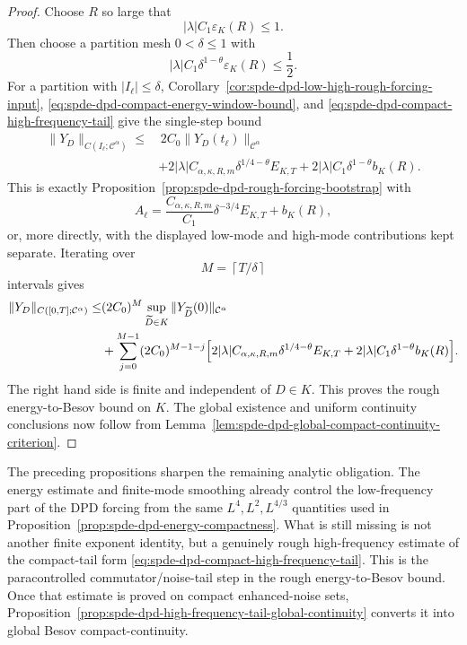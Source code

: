 \begin{proof}
Choose \(R\) so large that
\[
  |\lambda|C_1\varepsilon_K(R)\leq1 .
\]
Then choose a partition mesh \(0<\delta\leq1\) with
\begin{equation}
  |\lambda|C_1\delta^{1-\theta}\varepsilon_K(R)\leq\frac12 .
  \label{eq:spde-dpd-tail-global-absorption-choice}
\end{equation}
For a partition with \(|I_\ell|\leq\delta\),
Corollary~\ref{cor:spde-dpd-low-high-rough-forcing-input},
\eqref{eq:spde-dpd-compact-energy-window-bound}, and
\eqref{eq:spde-dpd-compact-high-frequency-tail} give the single-step bound
\[
\begin{aligned}
  \|Y_D\|_{C(I_\ell;\mathcal C^\alpha)}
  \leq
  &\,2C_0\|Y_D(t_\ell)\|_{\mathcal C^\alpha}
\\
  &+2|\lambda|C_{\alpha,\kappa,R,m}\delta^{1/4-\theta}E_{K,T}
   +2|\lambda|C_1\delta^{1-\theta}b_K(R).
\end{aligned}
\]
This is exactly Proposition~\ref{prop:spde-dpd-rough-forcing-bootstrap}
with
\[
  A_\ell
  =
  \frac{C_{\alpha,\kappa,R,m}}{C_1}
  \delta^{-3/4}E_{K,T}+b_K(R),
\]
or, more directly, with the displayed low-mode and high-mode contributions
kept separate.  Iterating over
\[
  M=\left\lceil T/\delta\right\rceil
\]
intervals gives
\[
\begin{aligned}
  \|Y_D\|_{C([0,T];\mathcal C^\alpha)}
  \leq
  &(2C_0)^M\sup_{\widetilde D\in K}
    \|Y_{\widetilde D}(0)\|_{\mathcal C^\alpha}
\\
  &+
  \sum_{j=0}^{M-1}(2C_0)^{M-1-j}
  \Bigl[
    2|\lambda|C_{\alpha,\kappa,R,m}\delta^{1/4-\theta}E_{K,T}
    +2|\lambda|C_1\delta^{1-\theta}b_K(R)
  \Bigr].
\end{aligned}
\]
The right hand side is finite and independent of \(D\in K\).  This proves
the rough energy-to-Besov bound on \(K\).  The global existence and uniform
continuity conclusions now follow from
Lemma~\ref{lem:spde-dpd-global-compact-continuity-criterion}.
\end{proof}

The preceding propositions sharpen the remaining analytic obligation.  The
energy estimate and finite-mode smoothing already control the low-frequency
part of the DPD forcing from the same \(L^4,L^2,L^{4/3}\) quantities used in
Proposition~\ref{prop:spde-dpd-energy-compactness}.  What is still missing
is not another finite exponent identity, but a genuinely rough
high-frequency estimate of the compact-tail form
\eqref{eq:spde-dpd-compact-high-frequency-tail}.  This is the
paracontrolled commutator/noise-tail step in the rough energy-to-Besov
bound.  Once that estimate is proved on compact enhanced-noise sets,
Proposition~\ref{prop:spde-dpd-high-frequency-tail-global-continuity}
converts it into global Besov compact-continuity.

